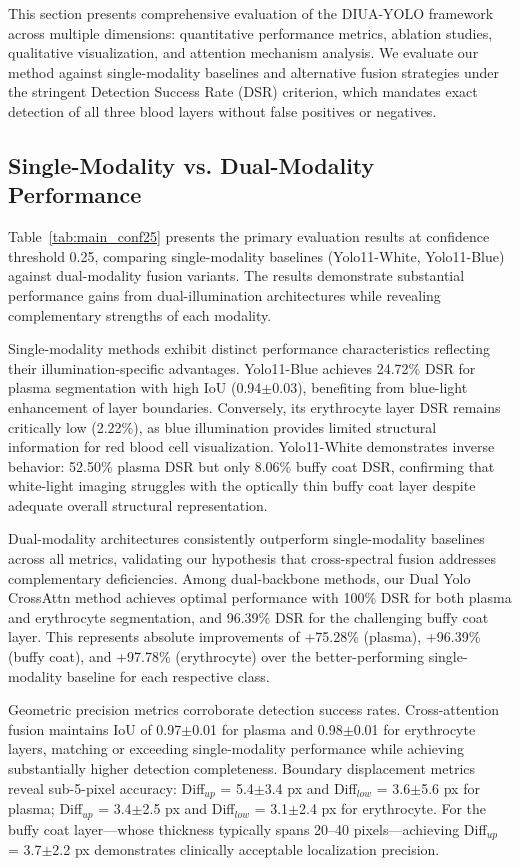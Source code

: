 \documentclass[journal,twoside,web]{ieeecolor}
\begin{document}
This section presents comprehensive evaluation of the DIUA-YOLO framework across multiple dimensions: quantitative performance metrics, ablation studies, qualitative visualization, and attention mechanism analysis. We evaluate our method against single-modality baselines and alternative fusion strategies under the stringent Detection Success Rate (DSR) criterion, which mandates exact detection of all three blood layers without false positives or negatives.


\subsection{Single-Modality vs. Dual-Modality Performance}

Table~\ref{tab:main_conf25} presents the primary evaluation results at confidence threshold 0.25, comparing single-modality baselines (Yolo11-White, Yolo11-Blue) against dual-modality fusion variants. The results demonstrate substantial performance gains from dual-illumination architectures while revealing complementary strengths of each modality.

Single-modality methods exhibit distinct performance characteristics reflecting their illumination-specific advantages. Yolo11-Blue achieves 24.72\% DSR for plasma segmentation with high IoU (0.94$\pm$0.03), benefiting from blue-light enhancement of layer boundaries. Conversely, its erythrocyte layer DSR remains critically low (2.22\%), as blue illumination provides limited structural information for red blood cell visualization. Yolo11-White demonstrates inverse behavior: 52.50\% plasma DSR but only 8.06\% buffy coat DSR, confirming that white-light imaging struggles with the optically thin buffy coat layer despite adequate overall structural representation.

Dual-modality architectures consistently outperform single-modality baselines across all metrics, validating our hypothesis that cross-spectral fusion addresses complementary deficiencies. Among dual-backbone methods, our Dual Yolo CrossAttn method achieves optimal performance with 100\% DSR for both plasma and erythrocyte segmentation, and 96.39\% DSR for the challenging buffy coat layer. This represents absolute improvements of +75.28\% (plasma), +96.39\% (buffy coat), and +97.78\% (erythrocyte) over the better-performing single-modality baseline for each respective class.

Geometric precision metrics corroborate detection success rates. Cross-attention fusion maintains IoU of 0.97$\pm$0.01 for plasma and 0.98$\pm$0.01 for erythrocyte layers, matching or exceeding single-modality performance while achieving substantially higher detection completeness. Boundary displacement metrics reveal sub-5-pixel accuracy: Diff$_{up}$ = 5.4$\pm$3.4 px and Diff$_{low}$ = 3.6$\pm$5.6 px for plasma; Diff$_{up}$ = 3.4$\pm$2.5 px and Diff$_{low}$ = 3.1$\pm$2.4 px for erythrocyte. For the buffy coat layer—whose thickness typically spans 20--40 pixels—achieving Diff$_{up}$ = 3.7$\pm$2.2 px demonstrates clinically acceptable localization precision.
\end{document}
